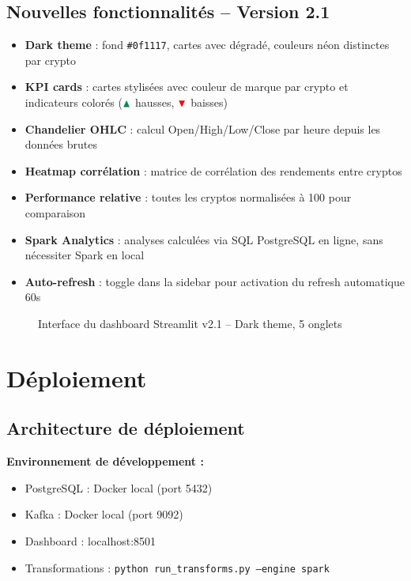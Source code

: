 \documentclass[12pt,a4paper]{article}
\begin{document}
\subsection{Nouvelles fonctionnalités -- Version 2.1}

\begin{itemize}
    \item \textbf{Dark theme} : fond \texttt{\#0f1117}, cartes avec dégradé, couleurs néon distinctes par crypto
    \item \textbf{KPI cards} : cartes stylisées avec couleur de marque par crypto et indicateurs colorés ($\color{greenok}\blacktriangle$ hausses, $\color{red}\blacktriangledown$ baisses)
    \item \textbf{Chandelier OHLC} : calcul Open/High/Low/Close par heure depuis les données brutes
    \item \textbf{Heatmap corrélation} : matrice de corrélation des rendements entre cryptos
    \item \textbf{Performance relative} : toutes les cryptos normalisées à 100 pour comparaison
    \item \textbf{Spark Analytics} : analyses calculées via SQL PostgreSQL en ligne, sans nécessiter Spark en local
    \item \textbf{Auto-refresh} : toggle dans la sidebar pour activation du refresh automatique 60s
\end{itemize}

\begin{figure}[H]
    \centering
    \caption{Interface du dashboard Streamlit v2.1 -- Dark theme, 5 onglets}
\end{figure}

\section{Déploiement}

\subsection{Architecture de déploiement}

\textbf{Environnement de développement :}
\begin{itemize}[noitemsep]
    \item PostgreSQL : Docker local (port 5432)
    \item Kafka : Docker local (port 9092)
    \item Dashboard : localhost:8501
    \item Transformations : \texttt{python run\_transforms.py --engine spark}
\end{itemize}
\end{document}
